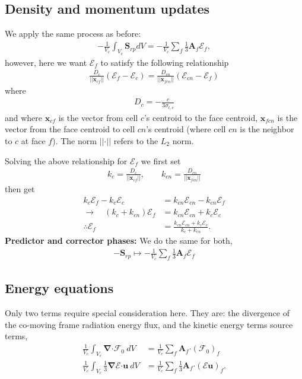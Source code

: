 \documentclass[10pt,letterpaper,notitlepage]{article}
\numberwithin{equation}{section}
\newcommand{\bnabla}{\boldsymbol{\nabla}}
\newcommand{\position}{\mathbf{x}}
\newcommand{\velocity}{\mathbf{u}}
\newcommand{\dotp}{\boldsymbol{\cdot}}
\newcommand{\RadE}{\mathcal{E}}
\newcommand{\RadF}{\boldsymbol{\mathcal{F}}}
\newcommand{\RadJ}{\RadF_0}
\newcommand{\AreaVec}{\mathbf{A}}
\newcommand{\beq}{\begin{equation*} \begin{aligned}}
\newcommand{\eeq}{\end{aligned}\end{equation*}}
\newcommand{\beqn}{\begin{equation}\begin{aligned}}
\newcommand{\eeqn}{\end{aligned}\end{equation}}
\begin{document}
\newpage
\subsection{Density and momentum updates} 
\label{section:fv_density_momentum_update}
We apply the same process as before:
\beqn 
-\frac{1}{V_c} \int_{V_c} \mathbf{S}_{rp} dV = -\frac{1}{V_c}  \sum_f \frac{1}{3} \AreaVec_f \RadE_f,
\eeqn 
however, here we want $\RadE_f$ to satisfy the following relationship
\beqn 
\frac{D_c}{||\position_{cf}||} (\RadE_f - \RadE_c) = 
\frac{D_{cn}}{||\position_{fcn}||} (\RadE_{cn} - \RadE_f) 
\eeqn 
where
\beqn 
D_c = -\frac{c}{3\sigma_{t,c}}
\eeqn 
and where $\position_{cf}$ is the vector from cell $c$'s centroid to the face centroid, $\position_{fcn}$ is the vector from the face centroid to cell $cn$'s centroid (where cell $cn$ is the neighbor to $c$ at face $f$). The norm $||\dotp||$ refers to the $L_2$ norm.

Solving the above relationship for $\RadE_f$ we first set
\beq 
k_c = \frac{D_c}{||\position_{cf}||} , \quad \quad
k_{cn} = \frac{D_{cn}}{||\position_{fcn}||}
\eeq 
then get
\beqn 
k_c \RadE_f - k_c \RadE_c &= k_{cn}  \RadE_{cn} - k_{cn}  \RadE_f \\
\to \quad 
(k_c + k_{cn} ) \RadE_f &= k_{cn}  \RadE_{cn} + k_c \RadE_c \\
\therefore
\RadE_f &= \frac{k_{cn}  \RadE_{cn} + k_c \RadE_c}{k_c +k_{cn} } .
\eeqn 
\newline
\newline 
\textbf{Predictor and corrector phases:} \newline 
We do the same for both,
\beqn
-\mathbf{S}_{rp} \mapsto  -\frac{1}{V_c}  \sum_f  \frac{1}{3} \AreaVec_f \RadE_f
\eeqn



\subsection{Energy equations}
\label{section:fv_energy_equations}
Only two terms require special consideration here. They are: the divergence of the co-moving frame radiation energy flux, and the kinetic energy terms source terms,
\beqn 
\frac{1}{V_c} \int_{V_c} \bnabla \dotp \RadJ \ dV &= \frac{1}{V_c} \sum_f \AreaVec_f \dotp (\RadJ)_f \\
\frac{1}{V_c} \int_{V_c} \frac{1}{3} \bnabla \RadE \dotp \velocity \ dV &= \frac{1}{V_c} \sum_f \frac{1}{3} \AreaVec_f \dotp (\RadE \velocity)_f.
\eeqn 
\end{document}
